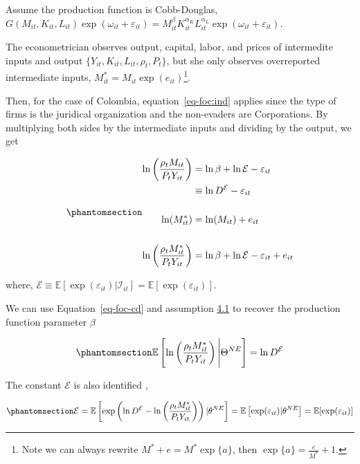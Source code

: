 \documentclass[
  12pt]{article}
\theoremstyle{definition}
\theoremstyle{remark}
\begin{document}
Assume the production function is Cobb-Douglas,
\(G(M_{it}, K_{it}, L_{it})\exp(\omega_{it}+\varepsilon_{it})=M^{\beta}_{it}K_{it}^{\alpha_K}L_{it}^{\alpha_L}\exp(\omega_{it}+\varepsilon_{it})\).

The econometrician observes output, capital, labor, and prices of
intermedite inputs and output \(\{Y_{it},K_{it},L_{it},\rho_t, P_t\}\),
but she only observes overreported intermediate inputs,
\(M^*_{it}=M_{it}\exp(e_{it})\)\footnote{Note we can always rewrite
  \(M^*+e=M^*\exp\{a\}\), then \(\exp\{a\}=\frac{e}{M^*}+1\).}.

Then, for the case of Colombia, equation~\ref{eq-foc:ind} applies since
the type of firms is the juridical organization and the non-evaders are
Corporations. By multiplying both sides by the intermediate inputs and
dividing by the output, we get

\begin{equation}\phantomsection\label{eq-foc-cd}{
\begin{aligned}
    \ln\left(\frac{\rho_t M_{it}}{P_{t}Y_{it}}\right) &=\ln\beta + \ln \mathcal{E}- \varepsilon_{it} \\
    &\equiv \ln D^{\mathcal{E}}- \varepsilon_{it} \\
    &\\
    \ln(M^*_{it})&=\ln(M_{it})+e_{it} \\ 
    &\\
    \ln\left(\frac{\rho_t M^*_{it}}{P_{t}Y_{it}}\right) &=\ln\beta + \ln \mathcal{E}- \varepsilon_{it}+e_{it} \\
\end{aligned}
}\end{equation}

where,
\(\mathcal{E}\equiv \mathbb{E}[\exp(\varepsilon_{it})|\mathcal{I}_{it}]=\mathbb{E}[\exp(\varepsilon_{it})]\).

We can use Equation~\ref{eq-foc-cd} and assumption
\hyperref[ass-non-ev]{4.1} to recover the production function parameter
\(\beta\)

\begin{equation}\phantomsection\label{eq-foc-cd-exp}{
    \mathbb{E}\left[\ln\left(\frac{\rho_t M^*_{it}}{P_{t}Y_{it}}\right)\Bigg| \Theta^{NE}\right]=\ln D^{\mathcal{E}}
}\end{equation}

The constant \(\mathcal{E}\) is also identified \citep{Gandhi2020},

\begin{equation}\phantomsection\label{eq-id-E}{
\mathcal{E}=\mathbb{E}\left[\exp\left(\ln D^{\mathcal{E}}- \ln\left(\frac{\rho_t M^*_{it}}{P_{t}Y_{it}}\right)\right)|\theta^{NE}\right]=\mathbb{E}\left[\exp(\varepsilon_{it})|\theta^{NE}\right]=\mathbb{E}[\exp(\varepsilon_{it})]
}\end{equation}
\end{document}

